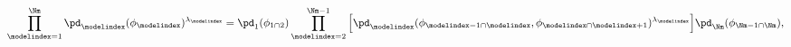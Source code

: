\begin{equation}
  \prod_{\modelindex = 1}^{\Nm}
    \pd_{\modelindex}(\phi_{\modelindex})^{\lambda_{\modelindex}}
  = 
  \pd_{1}(\phi_{1 \cap 2})
  \prod_{\modelindex = 2}^{\Nm - 1}
  \Big[
    \pd_{\modelindex}(\phi_{\modelindex - 1 \cap \modelindex}, \phi_{\modelindex \cap \modelindex + 1})^{\lambda_{\modelindex}}
  \Big]
  \pd_{\Nm}(\phi_{\Nm - 1 \cap \Nm}),
  \label{eqn:pooled-prior-log-alt-def}
\end{equation}